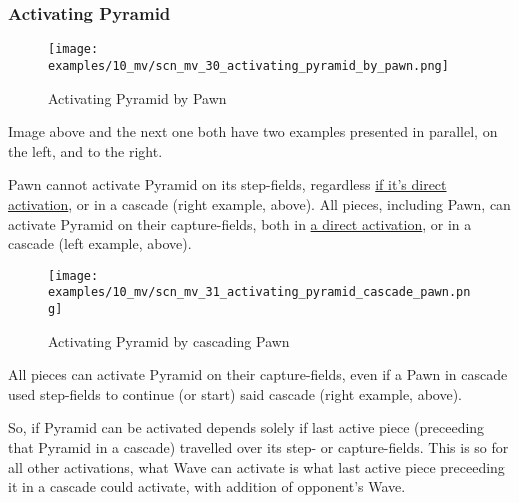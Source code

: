 \clearpage %

\subsubsection*{Activating Pyramid}

\vspace*{-1.4\baselineskip}
\noindent
\begin{figure}[!h]
\texttt{[image: examples/10\_mv/scn\_mv\_30\_activating\_pyramid\_by\_pawn.png]}
\vspace*{-1.3\baselineskip}
\caption{Activating Pyramid by Pawn}
\label{fig:scn_mv_30_activating_pyramid_by_pawn}
\end{figure}

\vspace*{-0.3\baselineskip}
Image above and the next one both have two examples presented in parallel, on the left,
and to the right.

Pawn cannot activate Pyramid on its step-fields, regardless
\hyperref[fig:scn_ma_04_pyramid_activation_by_pawn]{if it's direct activation}, or in a cascade
(right example, above). All pieces, including Pawn, can activate Pyramid on their capture-fields,
both in \hyperref[fig:scn_ma_01_pyramid_activation_init]{a direct activation}, or in a cascade
(left example, above).

\clearpage %

\vspace*{-2.1\baselineskip}
\noindent
\begin{figure}[!h]
\texttt{[image: examples/10\_mv/scn\_mv\_31\_activating\_pyramid\_cascade\_pawn.png]}
\vspace*{-1.3\baselineskip}
\caption{Activating Pyramid by cascading Pawn}
\label{fig:scn_mv_31_activating_pyramid_cascade_pawn}
\end{figure}

\vspace*{-0.3\baselineskip}
All pieces can activate Pyramid on their capture-fields, even if a Pawn in cascade used
step-fields to continue (or start) said cascade (right example, above).

So, if Pyramid can be activated depends solely if last active piece (preceeding that Pyramid
in a cascade) travelled over its step- or capture-fields. This is so for all other activations,
what Wave can activate is what last active piece preceeding it in a cascade could activate,
with addition of opponent's Wave.

